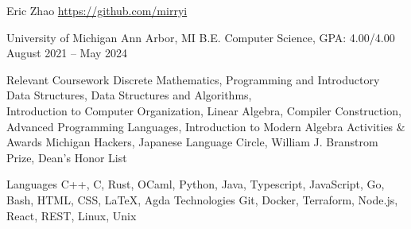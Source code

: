 \documentclass[letterpaper,11pt]{article}
\begin{document}
\rheading
  {Eric Zhao}
  {}
  {\href{https://github.com/mirryi}{https://github.com/mirryi}}
  {}

  \begin{rsectionlist}
    \rsectionitem%
      {University of Michigan}
      {Ann Arbor, MI}
      {B.E. Computer Science, GPA: 4.00/4.00}
      {August 2021 -- May 2024}
      \begin{rpointlist}
        \rpoint
          {Relevant Coursework}
          {Discrete Mathematics, Programming and Introductory Data Structures, Data Structures and
            Algorithms, \\ Introduction to Computer Organization, Linear Algebra, Compiler
            Construction, Advanced Programming Languages, Introduction to Modern Algebra}
        \rpoint
          {Activities \& Awards}
          {Michigan Hackers, Japanese Language Circle, William J. Branstrom Prize, Dean's Honor List}
      \end{rpointlist}
  \end{rsectionlist}

  \begin{rlinelist}
    \rline
      {Languages}
      {C++, C, Rust, OCaml, Python, Java, Typescript, JavaScript, Go, Bash, HTML, CSS, \LaTeX, Agda}
    \rline
      {Technologies}
      {Git, Docker, Terraform, Node.js, React, REST, Linux, Unix}
  \end{rlinelist}
\end{document}
